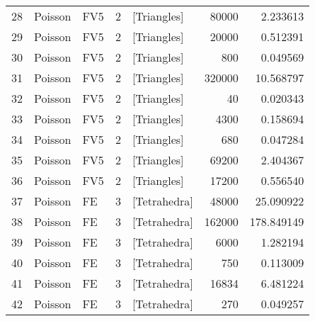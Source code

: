 \begin{tabular}{lllrlrr}
28 &   Poisson &                   FV5 &               2 &    [Triangles] &                    80000 &                         2.233613 \\
29 &   Poisson &                   FV5 &               2 &    [Triangles] &                    20000 &                         0.512391 \\
30 &   Poisson &                   FV5 &               2 &    [Triangles] &                      800 &                         0.049569 \\
31 &   Poisson &                   FV5 &               2 &    [Triangles] &                   320000 &                        10.568797 \\
32 &   Poisson &                   FV5 &               2 &    [Triangles] &                       40 &                         0.020343 \\
33 &   Poisson &                   FV5 &               2 &    [Triangles] &                     4300 &                         0.158694 \\
34 &   Poisson &                   FV5 &               2 &    [Triangles] &                      680 &                         0.047284 \\
35 &   Poisson &                   FV5 &               2 &    [Triangles] &                    69200 &                         2.404367 \\
36 &   Poisson &                   FV5 &               2 &    [Triangles] &                    17200 &                         0.556540 \\
37 &   Poisson &                    FE &               3 &   [Tetrahedra] &                    48000 &                        25.090922 \\
38 &   Poisson &                    FE &               3 &   [Tetrahedra] &                   162000 &                       178.849149 \\
39 &   Poisson &                    FE &               3 &   [Tetrahedra] &                     6000 &                         1.282194 \\
40 &   Poisson &                    FE &               3 &   [Tetrahedra] &                      750 &                         0.113009 \\
41 &   Poisson &                    FE &               3 &   [Tetrahedra] &                    16834 &                         6.481224 \\
42 &   Poisson &                    FE &               3 &   [Tetrahedra] &                      270 &                         0.049257 \\

\end{tabular}

